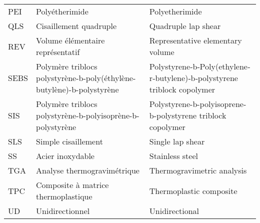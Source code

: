 \begin{longtable}{p{1in}>{\raggedright\arraybackslash}p{2.5in} p{2.45in}}
	PEI                   & Polyétherimide                                                        & Polyetherimide                                                           \\
	QLS                   & Cisaillement quadruple                                                & Quadruple lap shear                                                      \\
	REV                   & Volume élémentaire représentatif                                      & Representative elementary volume                                         \\
	SEBS                  & Polymère triblocs polystyrène-b-poly(éthylène-butylène)-b-polystyrène & Polystyrene‐b‐Poly(ethylene‐r‐butylene)‐b‐polystyrene triblock copolymer \\
	SIS                   & Polymère triblocs polystyrène-b-polyisoprène-b-polystyrène            & Polystyrene-b-polyisoprene-b-polystyrene triblock copolymer              \\
	SLS                   & Simple cisaillement                                                   & Single lap shear                                                         \\
	SS                    & Acier inoxydable                                                      & Stainless steel                                                          \\
	TGA                   & Analyse thermogravimétrique                                           & Thermogravimetric analysis                                               \\
	TPC                   & Composite à matrice thermoplastique                                   & Thermoplastic composite                                                  \\
	UD                    & Unidirectionnel                                                       & Unidirectional
\end{longtable}